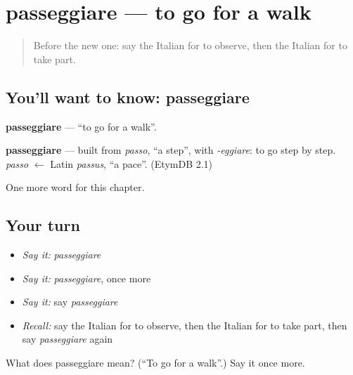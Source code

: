 \section[passeggiare]{passeggiare — to go for a walk}

\label{lesson:IT-C180-passeggiare}



\begin{quote}
Before the new one: say the Italian for to observe, then the Italian for to take part.
\end{quote}

\subsection*{You'll want to know: passeggiare}
\textbf{passeggiare} — \textquotedblleft{}to go for a walk\textquotedblright{}.

\begin{cousinweb}
\textbf{passeggiare} — built from \emph{passo}, \textquotedblleft{}a step\textquotedblright{}, with \emph{-eggiare}: to go step by step. \emph{passo} $\leftarrow$ Latin \emph{passus}, \textquotedblleft{}a pace\textquotedblright{}. (EtymDB 2.1)
\end{cousinweb}

\begin{grammarlens}[title={What you've built}]
One more word for this chapter.
\end{grammarlens}

\subsection*{Your turn}
\begin{itemize}
\raggedright
  \item \emph{Say it:} \emph{passeggiare}
  \item \emph{Say it:} \emph{passeggiare}, once more
  \item \emph{Say it:} say \emph{passeggiare}
  \item \emph{Recall:} say the Italian for to observe, then the Italian for to take part, then say \emph{passeggiare} again
\end{itemize}

\begin{tcolorbox}[breakable,colback=teal!4,colframe=teal!35!black,title={Before you move on}]
What does passeggiare mean? (\textquotedblleft{}To go for a walk\textquotedblright{}.) Say it once more.
\end{tcolorbox}
